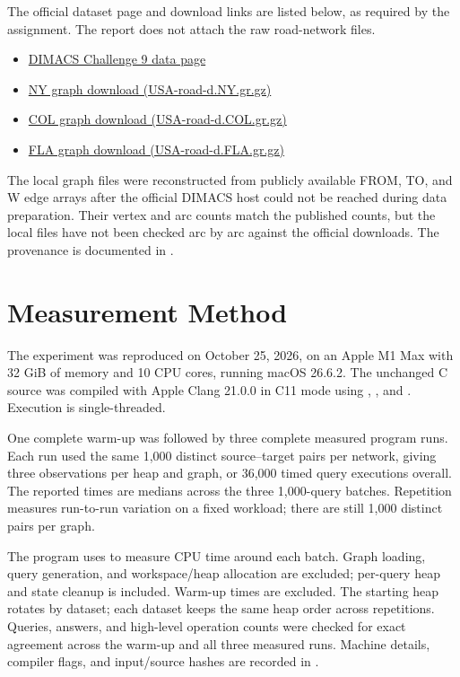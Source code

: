 \documentclass[12pt,a4paper]{report}
\newcommand{\code}[1]{\texttt{\detokenize{#1}}}
\begin{document}
The official dataset page and download links are listed below, as required by
the assignment. The report does not attach the raw road-network files.

\begin{itemize}
  \item \href{https://www.diag.uniroma1.it/challenge9/download.shtml}{DIMACS Challenge 9 data page}
  \item \href{https://www.diag.uniroma1.it/challenge9/data/USA-road-d/USA-road-d.NY.gr.gz}{NY graph download (USA-road-d.NY.gr.gz)}
  \item \href{https://www.diag.uniroma1.it/challenge9/data/USA-road-d/USA-road-d.COL.gr.gz}{COL graph download (USA-road-d.COL.gr.gz)}
  \item \href{https://www.diag.uniroma1.it/challenge9/data/USA-road-d/USA-road-d.FLA.gr.gz}{FLA graph download (USA-road-d.FLA.gr.gz)}
\end{itemize}

The local graph files were reconstructed from publicly available FROM, TO,
and W edge arrays after the official DIMACS host could not be reached during
data preparation. Their vertex and arc counts match the published counts,
but the local files have not been checked arc by arc against the official
downloads. The provenance is documented in .

\section{Measurement Method}
The experiment was reproduced on October 25, 2026, on an Apple M1 Max
with 32 GiB of memory and 10 CPU cores, running macOS 26.6.2.
The unchanged C source was compiled with Apple Clang 21.0.0 in C11 mode
using \code{-O2}, \code{-Wall}, and \code{-Wextra}. Execution is single-threaded.

One complete warm-up was followed by three complete measured program runs.
Each run used the same 1,000 distinct source--target pairs per network,
giving three observations per heap and graph, or 36,000 timed query
executions overall. The reported times are medians across the three
1,000-query batches. Repetition measures run-to-run variation on a fixed
workload; there are still 1,000 distinct pairs per graph.

The program uses \code{clock()} to measure CPU time around each batch.
Graph loading, query generation, and workspace/heap allocation are excluded;
per-query heap and state cleanup is included. Warm-up times are excluded.
The starting heap rotates by dataset; each dataset keeps the same heap order
across repetitions. Queries, answers, and high-level operation counts were
checked for exact agreement across the warm-up and all three measured runs.
Machine details, compiler flags, and input/source hashes are recorded in
.
\end{document}
